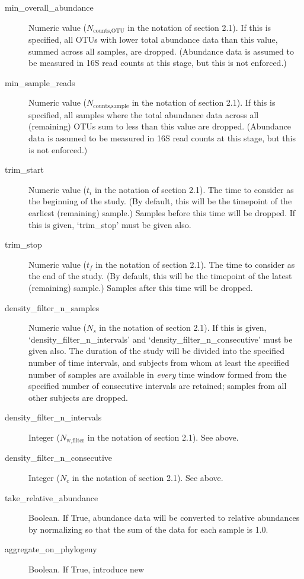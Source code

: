 \documentclass[12pt]{report}
\begin{document}
\begin{description}
\item[min\_overall\_abundance] Numeric value ($N_\text{counts,OTU}$ in
  the notation of section 2.1). If this is specified, all OTUs with
  lower total abundance data than this value, summed across all
  samples, are dropped. (Abundance data is assumed to be measured in
  16S read counts at this stage, but this is not enforced.)
\item[min\_sample\_reads] Numeric value ($N_\text{counts,sample}$ in
  the notation of section 2.1). If this is specified, all samples
  where the total abundance data across all (remaining) OTUs sum to
  less than this value are dropped. (Abundance data is assumed to be
  measured in 16S read counts at this stage, but this is not
  enforced.)
\item[trim\_start] Numeric value ($t_i$ in the notation of section
  2.1). The time to consider as the beginning of the study. (By
  default, this will be the timepoint of the earliest (remaining)
  sample.) Samples before this time will be dropped. If this is given,
  `trim\_stop' must be given also.
\item[trim\_stop] Numeric value ($t_f$ in the notation of section
  2.1). The time to consider as the end of the study. (By
  default, this will be the timepoint of the latest (remaining)
  sample.) Samples after this time will be dropped.
\item[density\_filter\_n\_samples] Numeric value ($N_s$ in the
  notation of section 2.1). If this is given,
  `density\_filter\_n\_intervals' and
  `density\_filter\_n\_consecutive' must be given also. The duration
  of the study will be divided into the specified number of time
  intervals, and subjects from whom at least the specified number of
  samples are available in \textit{every} time window formed from the
  specified number of consecutive intervals are retained; samples from
  all other subjects are dropped.
\item[density\_filter\_n\_intervals] Integer ($N_\text{w,filter}$ in
  the notation of section 2.1). See above.
\item[density\_filter\_n\_consecutive] Integer ($N_c$ in the notation
  of section 2.1). See above.
\item[take\_relative\_abundance] Boolean. If True, abundance data will
  be converted to relative abundances by normalizing so that the sum
  of the data for each sample is 1.0.
\item[aggregate\_on\_phylogeny] Boolean. If True, introduce new

\end{description}
\end{document}
